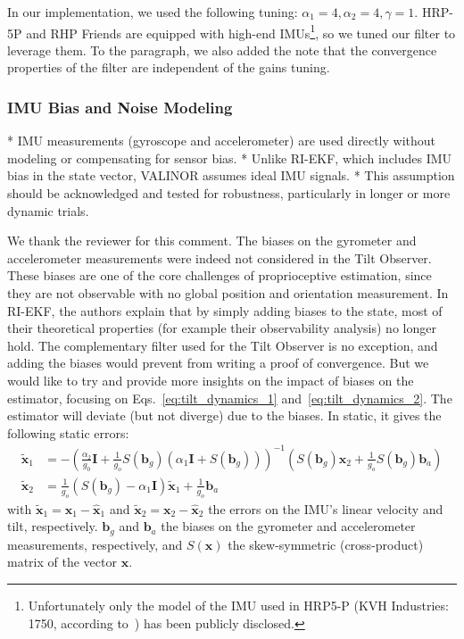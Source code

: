 In our implementation, we used the following tuning: $\alpha_{1} = 4, \alpha_{2} = 4, \gamma = 1$. HRP-5P and RHP Friends are equipped with high-end IMUs\footnote{Unfortunately only the model of the IMU used in HRP5-P (KVH Industries: 1750, according to~\cite{Kaneko2019Hrp5}) has been publicly disclosed.}, so we tuned our filter to leverage them. 
To the paragraph, we also added the note that the convergence properties of the filter are independent of the gains tuning.

\subsubsection{IMU Bias and Noise Modeling}

\begin{revquote}
* IMU measurements (gyroscope and accelerometer) are used directly without modeling or compensating for sensor bias.
* Unlike RI-EKF, which includes IMU bias in the state vector, VALINOR assumes ideal IMU signals.
* This assumption should be acknowledged and tested for robustness, particularly in longer or more dynamic trials.
\end{revquote}

We thank the reviewer for this comment. The biases on the gyrometer and accelerometer measurements were indeed not considered in the Tilt Observer. These biases are one of the core challenges of proprioceptive estimation, since they are not observable with no global position and orientation measurement. In RI-EKF, the authors explain that by simply adding biases to the state, most of their theoretical properties (for example their observability analysis) no longer hold. The complementary filter used for the Tilt Observer is no exception, and adding the biases would prevent from writing a proof of convergence.
But we would like to try and provide more insights on the impact of biases on the estimator, focusing on Eqs.~\eqref{eq:tilt_dynamics_1} and~\eqref{eq:tilt_dynamics_2}. 
The estimator will deviate (but  not diverge) due to the biases. In static, it gives the following static errors:
\begin{align}
  \tilde{\boldsymbol{x}}_{1}&=-\left(\frac{\alpha_{2}}{g_{0}}\boldsymbol{I}+\frac{1}{g_{o}}S\left(\boldsymbol{b}_{g}\right)\left(\alpha_{1}\boldsymbol{I}+S\left(\boldsymbol{b}_{g}\right)\right)\right)^{-1}\left(S\left(\boldsymbol{b}_{g}\right)\boldsymbol{x}_{2}+\frac{1}{g_{o}}S\left(\boldsymbol{b}_{g}\right)\boldsymbol{b}_{a}\right) \\
  \tilde{\boldsymbol{x}}_{2}&=\frac{1}{g_{o}}\left(S\left(\boldsymbol{b}_{g}\right)-\alpha_{1}\boldsymbol{I}\right)\tilde{\boldsymbol{x}}_{1}+\frac{1}{g_{o}}\boldsymbol{b}_{a}
\end{align}
with $\tilde{\boldsymbol{x}}_{1} = \boldsymbol{x}_{1} - \hat{\boldsymbol{x}}_{1}$ and $\tilde{\boldsymbol{x}}_{2} = \boldsymbol{x}_{2} - \hat{\boldsymbol{x}}_{2}$ the errors on the IMU's linear velocity and tilt, respectively. $\boldsymbol{b}_{g}$ and $\boldsymbol{b}_{a}$ the biases on the gyrometer and accelerometer measurements, respectively, and $S\left(\boldsymbol{x}\right)$ the skew-symmetric (cross-product) matrix of the vector $\boldsymbol{x}$. 



